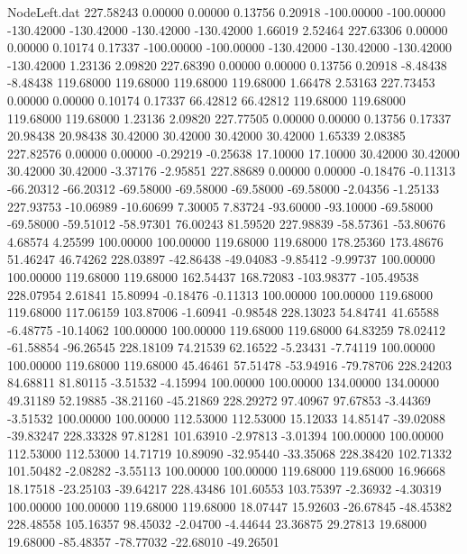 \begin{filecontents}{NodeLeft.dat}
 227.58243    0.00000    0.00000     0.13756    0.20918 -100.00000 -100.00000 -130.42000 -130.42000 -130.42000 -130.42000    1.66019    2.52464
 227.63306    0.00000    0.00000     0.10174    0.17337 -100.00000 -100.00000 -130.42000 -130.42000 -130.42000 -130.42000    1.23136    2.09820
 227.68390    0.00000    0.00000     0.13756    0.20918   -8.48438   -8.48438  119.68000  119.68000  119.68000  119.68000    1.66478    2.53163
 227.73453    0.00000    0.00000     0.10174    0.17337   66.42812   66.42812  119.68000  119.68000  119.68000  119.68000    1.23136    2.09820
 227.77505    0.00000    0.00000     0.13756    0.17337   20.98438   20.98438   30.42000   30.42000   30.42000   30.42000    1.65339    2.08385
 227.82576    0.00000    0.00000    -0.29219   -0.25638   17.10000   17.10000   30.42000   30.42000   30.42000   30.42000   -3.37176   -2.95851
 227.88689    0.00000    0.00000    -0.18476   -0.11313  -66.20312  -66.20312  -69.58000  -69.58000  -69.58000  -69.58000   -2.04356   -1.25133
 227.93753  -10.06989  -10.60699     7.30005    7.83724  -93.60000  -93.10000  -69.58000  -69.58000  -59.51012  -58.97301   76.00243   81.59520
 227.98839  -58.57361  -53.80676     4.68574    4.25599  100.00000  100.00000  119.68000  119.68000  178.25360  173.48676   51.46247   46.74262
 228.03897  -42.86438  -49.04083    -9.85412   -9.99737  100.00000  100.00000  119.68000  119.68000  162.54437  168.72083 -103.98377 -105.49538
 228.07954    2.61841   15.80994    -0.18476   -0.11313  100.00000  100.00000  119.68000  119.68000  117.06159  103.87006   -1.60941   -0.98548
 228.13023   54.84741   41.65588    -6.48775  -10.14062  100.00000  100.00000  119.68000  119.68000   64.83259   78.02412  -61.58854  -96.26545
 228.18109   74.21539   62.16522    -5.23431   -7.74119  100.00000  100.00000  119.68000  119.68000   45.46461   57.51478  -53.94916  -79.78706
 228.24203   84.68811   81.80115    -3.51532   -4.15994  100.00000  100.00000  134.00000  134.00000   49.31189   52.19885  -38.21160  -45.21869
 228.29272   97.40967   97.67853    -3.44369   -3.51532  100.00000  100.00000  112.53000  112.53000   15.12033   14.85147  -39.02088  -39.83247
 228.33328   97.81281  101.63910    -2.97813   -3.01394  100.00000  100.00000  112.53000  112.53000   14.71719   10.89090  -32.95440  -33.35068
 228.38420  102.71332  101.50482    -2.08282   -3.55113  100.00000  100.00000  119.68000  119.68000   16.96668   18.17518  -23.25103  -39.64217
 228.43486  101.60553  103.75397    -2.36932   -4.30319  100.00000  100.00000  119.68000  119.68000   18.07447   15.92603  -26.67845  -48.45382
 228.48558  105.16357   98.45032    -2.04700   -4.44644   23.36875   29.27813   19.68000   19.68000  -85.48357  -78.77032  -22.68010  -49.26501

\end{filecontents}
